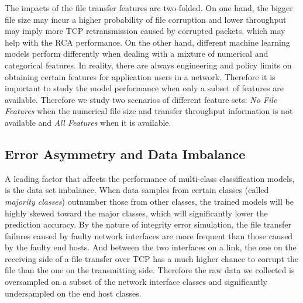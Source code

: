 The impacts of the file transfer features are two-folded. On one hand, the bigger file size may incur a higher probability of file corruption and lower throughput may imply more TCP retransmission caused by corrupted packets, which may help with the RCA performance. On the other hand, different machine learning models perform differently when dealing with a mixture of numerical and categorical features. In reality, there are always engineering and policy limits on obtaining certain 
features for application users in a network. Therefore it is important to study the model performance when only a subset of features are available. Therefore we study two scenarios of different feature sets: {\it No File Features} when the numerical file size and transfer throughput information is not available and {\it All Features} when it is available.

\subsection{Error Asymmetry and Data Imbalance} 
\label{sub:ml:imbalance}
A leading factor that affects the performance of multi-class classification models, is the data set imbalance. When data samples from certain classes (called {\it majority classes}) outnumber those from other classes, the trained models will be highly skewed toward the major classes, which will significantly lower the prediction accuracy. By the nature of integrity error simulation, the file transfer failures caused by faulty network interfaces are more frequent than those caused by the faulty end hosts. And between the two interfaces on a link, the one on the receiving side of a file transfer over TCP has a much higher chance to corrupt the file than the one on the transmitting side. Therefore the raw data we collected is oversampled on a subset of the network interface classes and significantly undersampled on the end host classes. 

